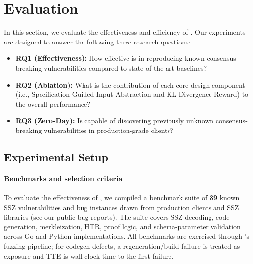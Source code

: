 \section{Evaluation}\label{sec:eval}

In this section, we evaluate the effectiveness and efficiency of \tool. Our experiments are designed to answer the following three research questions:

\begin{itemize}
    \item \textbf{RQ1 (Effectiveness):} How effective is \tool in reproducing known consensus-breaking vulnerabilities compared to state-of-the-art baselines?
    \item \textbf{RQ2 (Ablation):} What is the contribution of each core design component (i.e., Specification-Guided Input Abstraction and KL-Divergence Reward) to the overall performance?
    \item \textbf{RQ3 (Zero-Day):} Is \tool capable of discovering previously unknown consensus-breaking vulnerabilities in production-grade clients?
\end{itemize}

\subsection{Experimental Setup}

\paragraph{Benchmarks and selection criteria}

To evaluate the effectiveness of \tool, we compiled a benchmark suite of \textbf{39} known SSZ vulnerabilities and bug instances drawn from production clients and SSZ libraries (see our public bug reports). The suite covers SSZ decoding, code generation, merkleization, HTR, proof logic, and schema-parameter validation across Go and Python implementations. All benchmarks are exercised through \tool's fuzzing pipeline; for codegen defects, a regeneration/build failure is treated as exposure and TTE is wall-clock time to the first failure.

